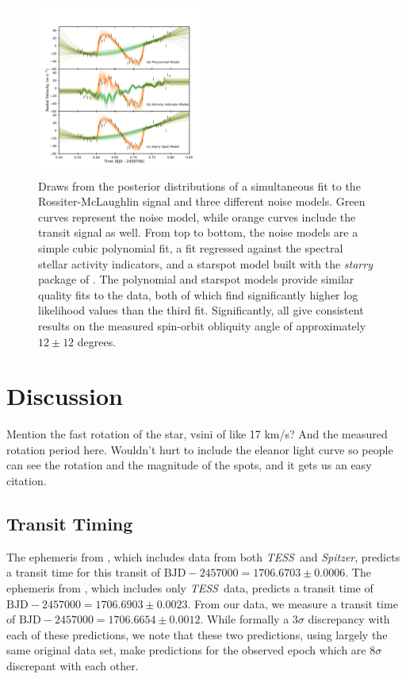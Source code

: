 \documentclass[twocolumn]{aastex63}
\newcommand{\tess}{{\it TESS}}
\newcommand{\spitz}{{\it Spitzer}}
\begin{document}
\begin{figure}[!tbh]
  \begin{center}
    \includegraphics[width=0.5\textwidth, trim={0cm 0.0cm 1cm 1cm}, clip=true]{../figures/model_comp.pdf}
   \end{center}
  \caption{Draws from the posterior distributions of a simultaneous fit to the
  Rossiter-McLaughlin signal and three different noise models. Green curves represent the noise model, while orange curves include the transit signal as well. From top to bottom, the noise models are a simple cubic polynomial fit, a fit regressed against the spectral stellar activity indicators, and a starspot model built with the \textit{starry} package of \citep{Luger19}. The polynomial and starspot models provide similar quality fits to the data, both of which find significantly higher log likelihood values than the third fit. Significantly, all give consistent results on the measured spin-orbit obliquity angle of approximately $12 \pm 12$ degrees.}
  \label{fig:models}
\end{figure}

\section{Discussion}
\label{sec:discussion}



Mention the fast rotation of the star, vsini of like 17 km/s? And the measured rotation period here. Wouldn't hurt to include the eleanor light curve so people can see the rotation and the magnitude of the spots, and it gets us an easy citation.

\subsection{Transit Timing}

The ephemeris from \citet{Newton19}, which includes data from both \tess\ and \spitz, predicts a transit time for this transit of $\textrm{BJD}- 2457000 = 1706.6703 \pm 0.0006$. 
The ephemeris from \citet{Benatti19}, which includes only \tess\ data, predicts a transit time of  $\textrm{BJD}- 2457000 = 1706.6903 \pm 0.0023$. 
From our data, we measure a transit time of $\textrm{BJD}- 2457000 = 1706.6654 \pm  0.0012$. 
While formally a $3\sigma$ discrepancy with each of these predictions, we note that these two predictions, using largely the same original data set, make predictions for the observed epoch which are $8\sigma$ discrepant with each other. 
\end{document}
